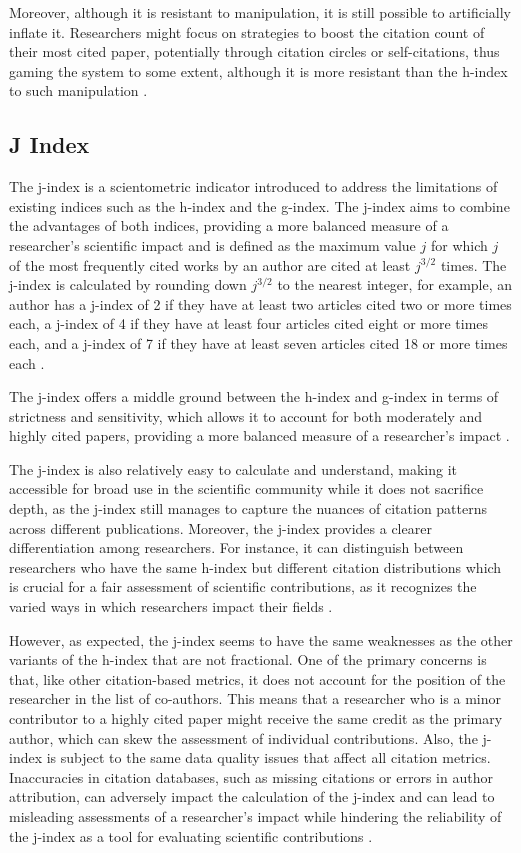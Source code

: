 Moreover, although it is resistant to manipulation, it is still possible to
artificially inflate it. Researchers might focus on strategies to boost the
citation count of their most cited paper, potentially through citation circles
or self-citations, thus gaming the system to some extent, although it is more
resistant than the h-index to such manipulation \cite{dorogovtsev2015ranking}.

\subsection{J Index}
The j-index is a scientometric indicator introduced to address the limitations
of existing indices such as the h-index and the g-index. The j-index aims to
combine the advantages of both indices, providing a more balanced measure of a
researcher's scientific impact and is defined as the maximum value $j$ for
which $j$ of the most frequently cited works by an author are cited at least
$j^{3/2}$ times. The j-index is calculated by rounding down $j^{3/2}$ to the
nearest integer, for example, an author has a j-index of 2 if they have at
least two articles cited two or more times each, a j-index of 4 if they have at
least four articles cited eight or more times each, and a j-index of 7 if they
have at least seven articles cited 18 or more times each
\cite{mikhailov2014new}.

The j-index offers a middle ground between the h-index and g-index in terms of
strictness and sensitivity, which allows it to account for both moderately and
highly cited papers, providing a more balanced measure of a researcher's impact
\cite{mikhailov2014new}.

The j-index is also relatively easy to calculate and understand, making it
accessible for broad use in the scientific community while it does not
sacrifice depth, as the j-index still manages to capture the nuances of
citation patterns across different publications. Moreover, the j-index provides
a clearer differentiation among researchers. For instance, it can distinguish
between researchers who have the same h-index but different citation
distributions which is crucial for a fair assessment of scientific
contributions, as it recognizes the varied ways in which researchers impact
their fields \cite{mikhailov2014new}.

However, as expected, the j-index seems to have the same weaknesses as the
other variants of the h-index that are not fractional. One of the primary
concerns is that, like other citation-based metrics, it does not account for
the position of the researcher in the list of co-authors. This means that a
researcher who is a minor contributor to a highly cited paper might receive the
same credit as the primary author, which can skew the assessment of individual
contributions. Also, the j-index is subject to the same data quality issues
that affect all citation metrics. Inaccuracies in citation databases, such as
missing citations or errors in author attribution, can adversely impact the
calculation of the j-index and can lead to misleading assessments of a
researcher’s impact while hindering the reliability of the j-index as a tool
for evaluating scientific contributions \cite{mikhailov2014new}.


